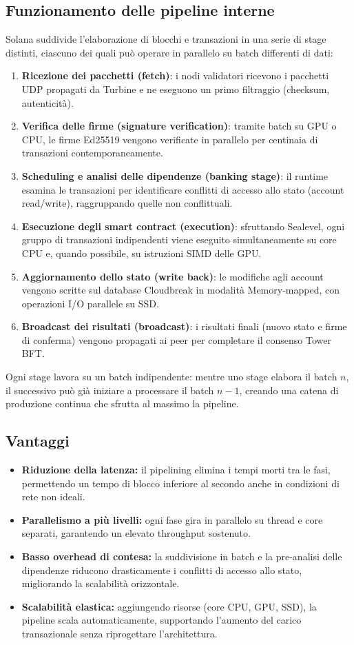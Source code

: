 \documentclass[a4paper,12pt]{report}
\begin{document}
	\subsection{Funzionamento delle pipeline interne}
	Solana suddivide l’elaborazione di blocchi e transazioni in una serie di stage distinti, ciascuno dei quali può operare in parallelo su batch differenti di dati:
	\begin{enumerate}
		\item \textbf{Ricezione dei pacchetti (fetch)}: i nodi validatori ricevono i pacchetti UDP propagati da Turbine e ne eseguono un primo filtraggio (checksum, autenticità).
		\item \textbf{Verifica delle firme (signature verification)}: tramite batch su GPU o CPU, le firme Ed25519 vengono verificate in parallelo per centinaia di transazioni contemporaneamente.
		\item \textbf{Scheduling e analisi delle dipendenze (banking stage)}: il runtime esamina le transazioni per identificare conflitti di accesso allo stato (account read/write), raggruppando quelle non conflittuali.
		\item \textbf{Esecuzione degli smart contract (execution)}: sfruttando Sealevel, ogni gruppo di transazioni indipendenti viene eseguito simultaneamente su core CPU e, quando possibile, su istruzioni SIMD delle GPU.
		\item \textbf{Aggiornamento dello stato (write back)}: le modifiche agli account vengono scritte sul database Cloudbreak in modalità Memory‑mapped, con operazioni I/O parallele su SSD.
		\item \textbf{Broadcast dei risultati (broadcast)}: i risultati finali (nuovo stato e firme di conferma) vengono propagati ai peer per completare il consenso Tower BFT.
	\end{enumerate}
	Ogni stage lavora su un batch indipendente: mentre uno stage elabora il batch \(n\), il successivo può già iniziare a processare il batch \(n-1\), creando una catena di produzione continua che sfrutta al massimo la pipeline.
	
	\subsection{Vantaggi}
	\begin{itemize}
		\item \textbf{Riduzione della latenza:} il pipelining elimina i tempi morti tra le fasi, permettendo un tempo di blocco inferiore al secondo anche in condizioni di rete non ideali.
		\item \textbf{Parallelismo a più livelli:} ogni fase gira in parallelo su thread e core separati, garantendo un elevato throughput sostenuto.
		\item \textbf{Basso overhead di contesa:} la suddivisione in batch e la pre-analisi delle dipendenze riducono drasticamente i conflitti di accesso allo stato, migliorando la scalabilità orizzontale.
		\item \textbf{Scalabilità elastica:} aggiungendo risorse (core CPU, GPU, SSD), la pipeline scala automaticamente, supportando l’aumento del carico transazionale senza riprogettare l’architettura.
	\end{itemize}
	
\end{document}
